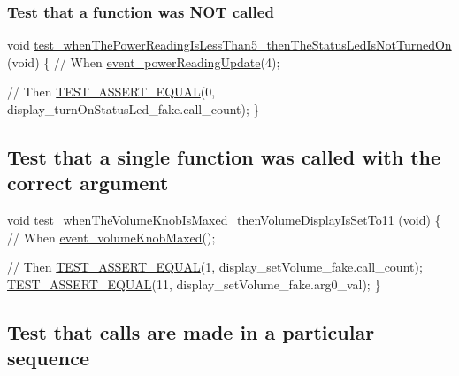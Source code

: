 \subsubsection*{Test that a function was N\+OT called}


\begin{DoxyCode}
\textcolor{keywordtype}{void}
\hyperlink{test__event__processor_8c_ae0402ad0b5090fc576a46cd6a37e3098}{test\_whenThePowerReadingIsLessThan5\_thenTheStatusLedIsNotTurnedOn}
      (\textcolor{keywordtype}{void})
\{
    \textcolor{comment}{// When}
    \hyperlink{event__processor_8c_ab67dfe66cdf6520c6a2fe56416ec49ee}{event\_powerReadingUpdate}(4);

    \textcolor{comment}{// Then}
    \hyperlink{unity_8h_af9e5695d6c7cf634206ea6d062cb54c9}{TEST\_ASSERT\_EQUAL}(0, display\_turnOnStatusLed\_fake.call\_count);
\}
\end{DoxyCode}


\subsection*{Test that a single function was called with the correct argument}


\begin{DoxyCode}
\textcolor{keywordtype}{void}
\hyperlink{test__event__processor_8c_ab3dbd650a187ae78cbc203e26c7da3a5}{test\_whenTheVolumeKnobIsMaxed\_thenVolumeDisplayIsSetTo11}
      (\textcolor{keywordtype}{void})
\{
    \textcolor{comment}{// When}
    \hyperlink{event__processor_8c_af0c058d318f845e4ad837756121715d9}{event\_volumeKnobMaxed}();

    \textcolor{comment}{// Then}
    \hyperlink{unity_8h_af9e5695d6c7cf634206ea6d062cb54c9}{TEST\_ASSERT\_EQUAL}(1, display\_setVolume\_fake.call\_count);
    \hyperlink{unity_8h_af9e5695d6c7cf634206ea6d062cb54c9}{TEST\_ASSERT\_EQUAL}(11, display\_setVolume\_fake.arg0\_val);
\}
\end{DoxyCode}


\subsection*{Test that calls are made in a particular sequence}


